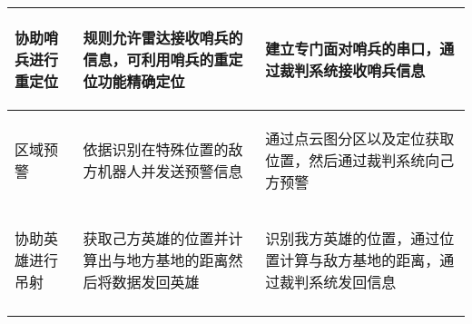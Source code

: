 \begin{longtable}{ p{2cm} | p{7.8cm} | p{6cm} |}
    \hline
    
        \begin{center}
            协助哨兵进行重定位
        \end{center} \cellcolor{gndcolor} &
        \begin{center}
            规则允许雷达接收哨兵的信息，可利用哨兵的重定位功能精确定位
        \end{center} \cellcolor{gndcolor} &
        \begin{center}
            建立专门面对哨兵的串口，通过裁判系统接收哨兵信息
        \end{center} \cellcolor{gndcolor} \\

    \hline
    
        \begin{center}
           区域预警
        \end{center} &
        \begin{center}
            依据识别在特殊位置的敌方机器人并发送预警信息
        \end{center} &
        \begin{center}
            通过点云图分区以及定位获取位置，然后通过裁判系统向己方预警
        \end{center} \\
        
    \hline
    
        \begin{center}
            协助英雄进行吊射
        \end{center} &
        \begin{center}
            获取己方英雄的位置并计算出与地方基地的距离然后将数据发回英雄
        \end{center} &
        \begin{center}
            识别我方英雄的位置，通过位置计算与敌方基地的距离，通过裁判系统发回信息
        \end{center} \\

    \hline
    
        \begin{center}
            
        \end{center} &
        \begin{center}
            

\end{center}
\end{longtable}
